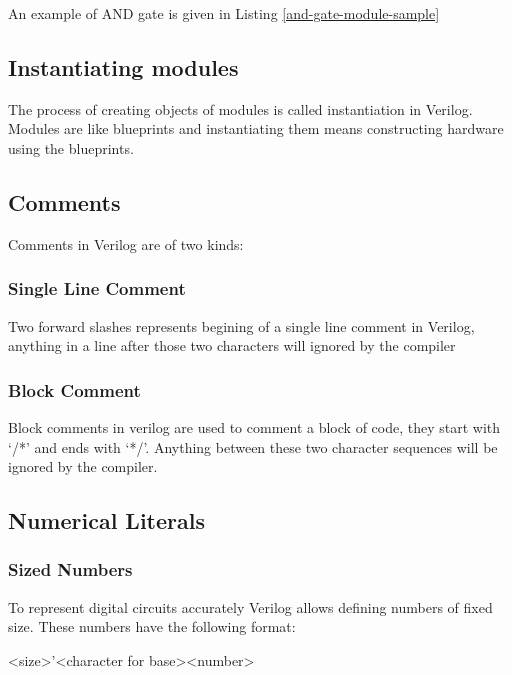 \documentclass[a4paper,10pt]{article}
\theoremstyle{mytheor}
\newcommand{
  \insertverilog}[3]{
  
}
\begin{document}
\break
\insertverilog{./verilog_files/module.v}{sample-module-bare}{\text{Sample module indicating its structure}}

An example of AND gate is given in Listing \ref{and-gate-module-sample}
\insertverilog{./verilog_files/andGate.v}{and-gate-module-sample}{\text{Illustrative AND gate module}}

\subsection*{Instantiating modules}
The process of creating objects of modules is called instantiation in Verilog. Modules are like blueprints and instantiating them means constructing hardware using the blueprints.

\break
\insertverilog{./verilog_files/AndGate3.v}{sample-module}{\text{Illustrative AND gate module}} 
\subsection*{Comments}
Comments in Verilog are of two kinds:
\subsubsection*{Single Line Comment}
Two forward slashes represents begining of a single line comment in Verilog, anything in a line after those two characters will ignored by the compiler
\insertverilog{./verilog_files/singleLineComment.v}{single-line-comment}{\text{Single line comment}} 

\subsubsection*{Block Comment}
Block comments in verilog are used to comment a block of code, they start with `/*' and ends with `*/'. Anything between these two character sequences will be ignored by the compiler.
\insertverilog{./verilog_files/blockComment.v}{block-comment}{\text{Block
    comment}}

\subsection*{Numerical Literals}
\subsubsection*{Sized Numbers}
To represent digital circuits accurately Verilog allows defining
numbers of fixed size. These numbers have the following format:
\begin{center}
  <size>'<character for base><number>
\end{center}
\end{document}
